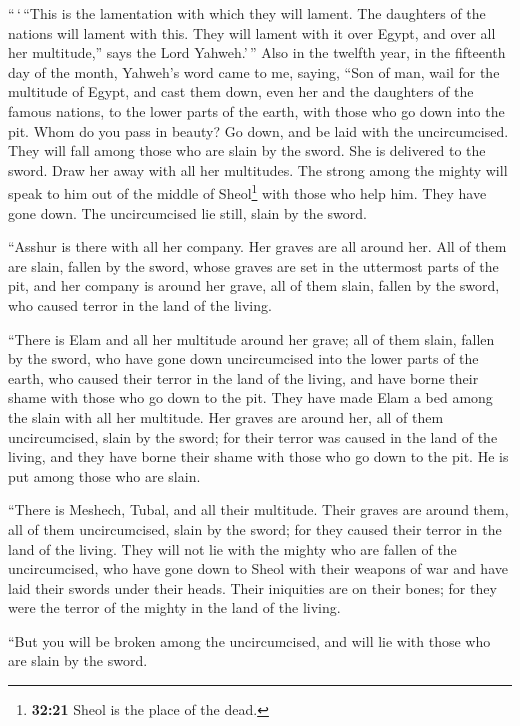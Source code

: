  ``\,`\,``This is the lamentation with which they will
lament. The daughters of the nations will lament with this. They will
lament with it over Egypt, and over all her multitude,'' says the Lord
Yahweh.'\,''  Also in the twelfth year, in the fifteenth
day of the month, Yahweh's word came to me, saying, 
``Son of man, wail for the multitude of Egypt, and cast them down, even
her and the daughters of the famous nations, to the lower parts of the
earth, with those who go down into the pit.  Whom do you
pass in beauty? Go down, and be laid with the uncircumcised.
 They will fall among those who are slain by the sword.
She is delivered to the sword. Draw her away with all her multitudes.
 The strong among the mighty will speak to him out of the
middle of Sheol\footnote{\textbf{32:21} Sheol is the place of the dead.}
with those who help him. They have gone down. The uncircumcised lie
still, slain by the sword.

 ``Asshur is there with all her company. Her graves are
all around her. All of them are slain, fallen by the sword,
 whose graves are set in the uttermost parts of the pit,
and her company is around her grave, all of them slain, fallen by the
sword, who caused terror in the land of the living.

 ``There is Elam and all her multitude around her grave;
all of them slain, fallen by the sword, who have gone down uncircumcised
into the lower parts of the earth, who caused their terror in the land
of the living, and have borne their shame with those who go down to the
pit.  They have made Elam a bed among the slain with all
her multitude. Her graves are around her, all of them uncircumcised,
slain by the sword; for their terror was caused in the land of the
living, and they have borne their shame with those who go down to the
pit. He is put among those who are slain.

 ``There is Meshech, Tubal, and all their multitude.
Their graves are around them, all of them uncircumcised, slain by the
sword; for they caused their terror in the land of the living.
 They will not lie with the mighty who are fallen of the
uncircumcised, who have gone down to Sheol with their weapons of war and
have laid their swords under their heads. Their iniquities are on their
bones; for they were the terror of the mighty in the land of the living.

 ``But you will be broken among the uncircumcised, and
will lie with those who are slain by the sword.

